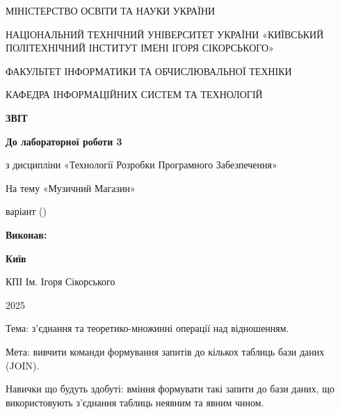 \documentclass{article}
\begin{document}
    \begin{titlepage}
        \begin{center}
            {\Large
                МІНІСТЕРСТВО ОСВІТИ ТА НАУКИ УКРАЇНИ

                НАЦІОНАЛЬНИЙ ТЕХНІЧНИЙ УНІВЕРСИТЕТ УКРАЇНИ
                «КИЇВСЬКИЙ ПОЛІТЕХНІЧНИЙ ІНСТИТУТ ІМЕНІ ІГОРЯ СІКОРСЬКОГО»

                ФАКУЛЬТЕТ ІНФОРМАТИКИ ТА ОБЧИСЛЮВАЛЬНОЇ ТЕХНІКИ

                КАФЕДРА ІНФОРМАЦІЙНИХ СИСТЕМ ТА ТЕХНОЛОГІЙ
            }


            \vspace{60mm}
            {\large
                \textbf{ЗВІТ}

                \vspace{5mm}

                \textbf{До лабораторної роботи 3}

                \vspace{5mm}

                з дисципліни «Технології Розробки Програмного Забезпечення»
            }

            На тему «Музичний Магазин»

            варіант  ()
        \end{center}

        \vfill
        \hfill
        \begin{minipage}[t]{0.35\textwidth}
            \textbf{Виконав:}
        \end{minipage}

        \vfill

        \begin{center}
            {\bf
                Київ

                КПІ Ім. Ігоря Сікорського

                2025
            }
        \end{center}
    \end{titlepage}
    \newpage

    Тема: з’єднання та теоретико-множинні операції над відношенням.

    Мета: вивчити команди формування запитів до кількох таблиць бази даних (JOIN).

    Навички що будуть здобуті: вміння формувати такі запити до бази даних, що використовують з’єднання таблиць неявним та явним чином.
\end{document}

